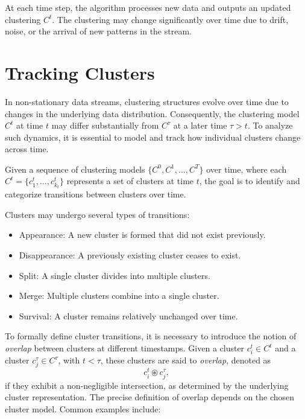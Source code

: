 At each time step, the algorithm processes new data and outputs an updated
clustering $C^t$. The clustering may change significantly over time due to
drift, noise, or the arrival of new patterns in the stream.

\section{Tracking Clusters}\label{sec:prob_tracking_clusters}
In non-stationary data streams, clustering structures evolve over time due to
changes in the underlying data distribution. Consequently, the clustering model
$C^t$ at time $t$ may differ substantially from $C^\tau$ at a later time $\tau
    > t$. To analyze such dynamics, it is essential to model and track how
individual clusters change across time.

Given a sequence of clustering models $\{C^0, C^1, \dots, C^T\}$ over time,
where each $C^t = \{c_1^t, \dots, c_{k_t}^t\}$ represents a set of clusters at
time $t$, the goal is to identify and categorize transitions between clusters
over time.

Clusters may undergo several types of transitions:

\begin{itemize}
    \item Appearance: A new cluster is formed that did not exist previously.
    \item Disappearance: A previously existing cluster ceases to exist.
    \item Split: A single cluster divides into multiple clusters.
    \item Merge: Multiple clusters combine into a single cluster.
    \item Survival: A cluster remains relatively unchanged over time.
\end{itemize}

To formally define cluster transitions, it is necessary to introduce the notion
of \emph{overlap} between clusters at different timestamps. Given a cluster $
    c_i^t \in C^t $ and a cluster $ c_j^\tau \in C^\tau $, with $ t < \tau $, these
clusters are said to \emph{overlap}, denoted as
\[
    c_i^t \circledast c_j^\tau,
\]
if they exhibit a non-negligible intersection, as determined by the underlying
cluster representation. The precise definition of overlap depends on the chosen
cluster model. Common examples include:

